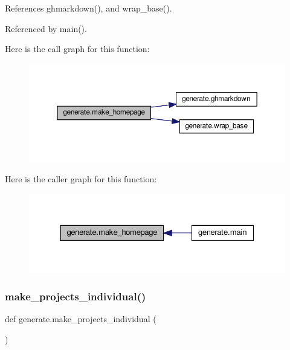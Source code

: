 References ghmarkdown(), and wrap\+\_\+base().



Referenced by main().

Here is the call graph for this function\+:
\nopagebreak
\begin{figure}[H]
\begin{center}
\leavevmode
\includegraphics[width=350pt]{namespacegenerate_acffbc7c203626a1f396da4a96a2d448d_cgraph}
\end{center}
\end{figure}
Here is the caller graph for this function\+:
\nopagebreak
\begin{figure}[H]
\begin{center}
\leavevmode
\includegraphics[width=325pt]{namespacegenerate_acffbc7c203626a1f396da4a96a2d448d_icgraph}
\end{center}
\end{figure}
\mbox{\label{namespacegenerate_a7e834fd25099e451f5809b35df4ef10d}} 
\subsubsection{\texorpdfstring{make\+\_\+projects\+\_\+individual()}{make\_projects\_individual()}}
{\footnotesize\ttfamily def generate.\+make\+\_\+projects\+\_\+individual (\begin{DoxyParamCaption}{ }\end{DoxyParamCaption})}




